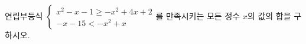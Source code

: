 연립부등식 $\begin{cases} x^2-x-1\ge -x^2+4x+2 \\ -x-15<-x^2+x \end{cases}$를 만족시키는 모든 정수 $x$의 값의 합을 구하시오.
